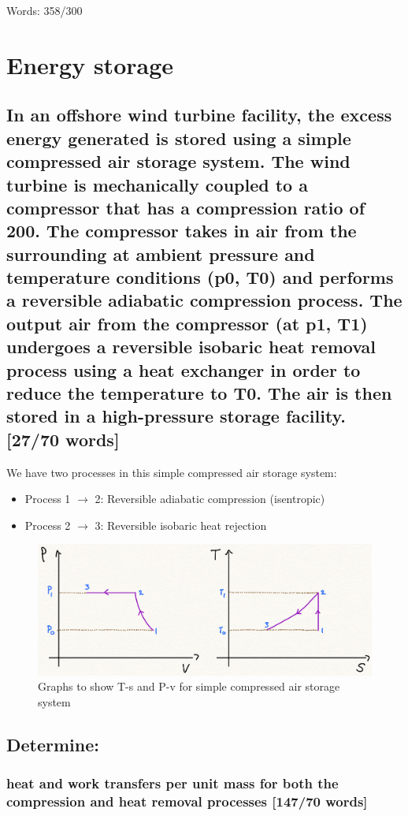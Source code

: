 \documentclass[12pt]{article}
\numberwithin{equation}{section}
\begin{document}
\begin{flushleft}
Words: 358/300
\section{Energy storage}
\subsection[Compressed air storage system.]{In an offshore wind turbine facility, the excess energy generated is stored using a simple compressed air storage system. The wind turbine is mechanically coupled to a compressor that has a compression ratio of 200. The compressor takes in air from the surrounding at ambient pressure and temperature conditions (p0, T0) and performs a reversible adiabatic compression process. The output air from the compressor (at p1, T1) undergoes a reversible isobaric heat removal process using a heat exchanger in order to reduce the temperature to T0. The air is then stored in a high-pressure storage facility. [27/70 words]}
We have two processes in this simple compressed air storage system:
\begin{itemize}
  \item Process 1 $\rightarrow$ 2: Reversible adiabatic compression (isentropic)
  \item Process 2 $\rightarrow$ 3: Reversible isobaric heat rejection
\end{itemize}

\begin{figure}[H]
  \centering
  \includegraphics[width  = \textwidth]{./img/TsPvDiagrams62.png}
  \caption{Graphs to show T-s and P-v for simple compressed air storage system}
\end{figure}

\subsection{Determine:}
\subsubsection[Heat/Work transfers.]{heat and work transfers per unit mass for both the compression and heat removal processes [147/70 words]}

\end{flushleft}
\end{document}
